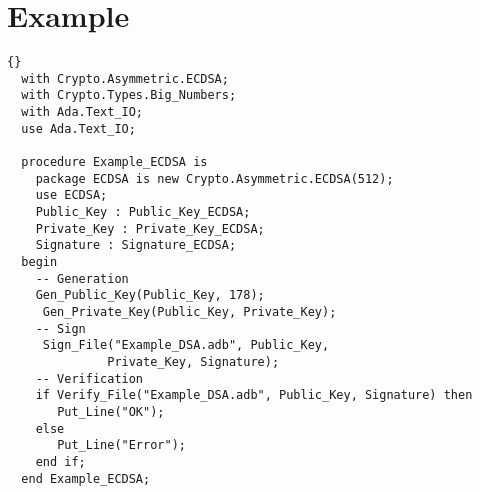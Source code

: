 \section{Example}
\begin{lstlisting}{}
  with Crypto.Asymmetric.ECDSA;
  with Crypto.Types.Big_Numbers;
  with Ada.Text_IO;
  use Ada.Text_IO;

  procedure Example_ECDSA is
  	package ECDSA is new Crypto.Asymmetric.ECDSA(512);
  	use ECDSA;
  	Public_Key : Public_Key_ECDSA;
  	Private_Key : Private_Key_ECDSA;
  	Signature : Signature_ECDSA;
  begin
    -- Generation
    Gen_Public_Key(Public_Key, 178);
  	 Gen_Private_Key(Public_Key, Private_Key);
  	-- Sign
  	 Sign_File("Example_DSA.adb", Public_Key,
  	          Private_Key, Signature);
  	-- Verification
  	if Verify_File("Example_DSA.adb", Public_Key, Signature) then
       Put_Line("OK");
    else
       Put_Line("Error");
    end if;
  end Example_ECDSA;
\end{lstlisting}
